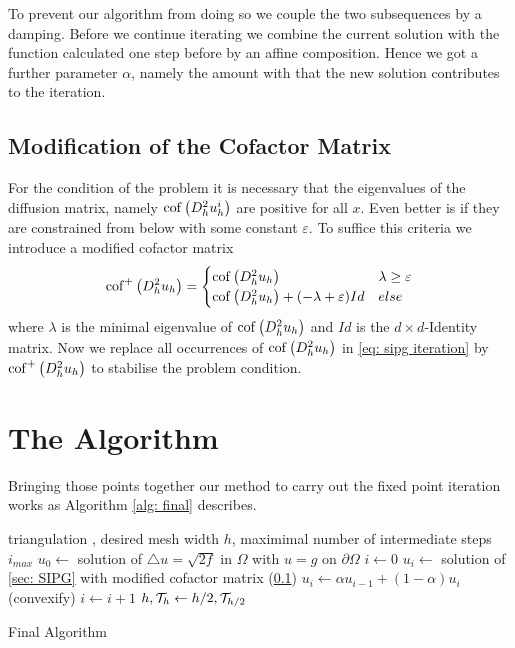 To prevent our algorithm from doing so we couple the two subsequences by a damping. Before we continue iterating we combine the current solution with the function calculated one step before by an affine composition. Hence we got a further parameter $\alpha$, namely the amount with that the new solution contributes to the iteration.

\subsection{Modification of the Cofactor Matrix}\label{sec: mod cofactor}
For the condition of the problem it is necessary that the eigenvalues of the diffusion matrix, namely $\operatorname{cof} \left( D_h^2 u_h^i \right)$ are positive for all $x$. Even better is if they are constrained from below with some constant $\varepsilon$. 
To suffice this criteria we introduce a modified cofactor matrix
\[ 
	\mycofMod {D^2_h u_h} = \begin{cases}
	\mycof {D^2_h u_h} & \lambda \geq \varepsilon	\\
	\mycof {D^2_h u_h}+ (-\lambda+\varepsilon) Id%
	& else
	\end{cases}
\]
where $\lambda$ is the minimal eigenvalue of $ \operatorname{cof} \left( D^2_h u_h \right)$ and $Id$ is the $d \times d$-Identity matrix. Now we replace all occurrences of $\operatorname{cof} \left( D^2_h u_h \right)$ in \eqref{eq: sipg iteration} by $\operatorname{cof}^+ \left( D^2_h u_h \right)$ to stabilise the problem condition.

\section{The Algorithm}

Bringing those points together our method to carry out the fixed point iteration works as Algorithm \ref{alg: final} describes.

\begin{algorithm}
\begin{algorithmic}
\Require triangulation \triang, desired mesh width $h$, maximimal number of intermediate steps $i_{max}$
\State $u_0\gets $ solution of  $
	\triangle u = \sqrt{2f} \text{ in } \Omega $ with $
	u = g \text{ on }\partial \Omega$
	\State $i \gets 0$
		\State $u_i \gets$ solution of \ref{sec: SIPG} with modified cofactor matrix (\ref{sec: mod cofactor})
		\State $u_i \gets \alpha u_{i-1} + (1-\alpha)u_i $
		\State (convexify)
		\State $i \gets i+1$
	\EndWhile
	\State $h, \mathcal{T}_h \gets h/2, \mathcal{T}_{h/2}$
\EndWhile
\end{algorithmic}
\caption{Final Algorithm}
\label{alg: final}
\end{algorithm}


